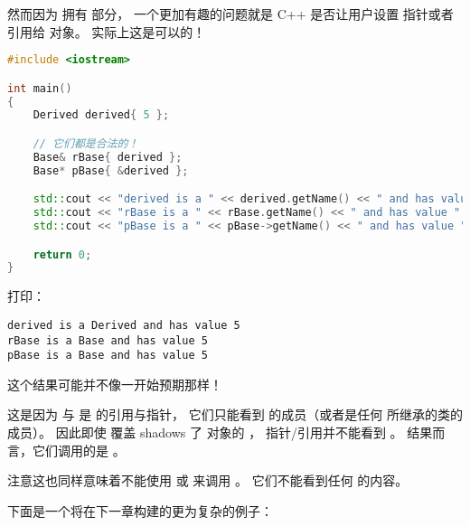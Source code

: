 \documentclass[../../LearnCpp.tex]{subfiles}
\begin{document}
然而因为  拥有  部分，
一个更加有趣的问题就是 C++ 是否让用户设置  指针或者引用给  对象。
实际上这是可以的！

\begin{lstlisting}[language=C++]
#include <iostream>

int main()
{
    Derived derived{ 5 };

    // 它们都是合法的！
    Base& rBase{ derived };
    Base* pBase{ &derived };

    std::cout << "derived is a " << derived.getName() << " and has value " << derived.getValue() << '\n';
    std::cout << "rBase is a " << rBase.getName() << " and has value " << rBase.getValue() << '\n';
    std::cout << "pBase is a " << pBase->getName() << " and has value " << pBase->getValue() << '\n';

    return 0;
}
\end{lstlisting}

打印：

\begin{lstlisting}
derived is a Derived and has value 5
rBase is a Base and has value 5
pBase is a Base and has value 5
\end{lstlisting}

这个结果可能并不像一开始预期那样！

这是因为  与  是  的引用与指针，
它们只能看到  的成员（或者是任何  所继承的类的成员）。
因此即使  覆盖 shadows 了  对象的 ，
 指针/引用并不能看到 。
结果而言，它们调用的是 。

注意这也同样意味着不能使用  或  来调用 。
它们不能看到任何  的内容。

下面是一个将在下一章构建的更为复杂的例子：
\end{document}
